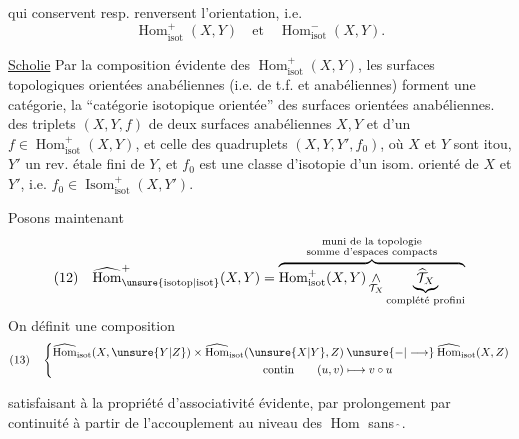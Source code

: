 qui conservent resp. renversent l'orientation, i.e.
\[
\operatorname{Hom}_{\mathrm{isot}}^+(X,Y)\quad\text{et}\quad\operatorname{Hom}_{\mathrm{isot}}^-(X,Y).
\]

\uline{Scholie} Par la composition évidente des $\operatorname{Hom}_{\mathrm{isot}}^+(X,Y)$, les surfaces topologiques orientées anabéliennes (i.e. de t.f. et anabéliennes)  forment une catégorie, la ``catégorie isotopique orientée'' des surfaces orientées anabéliennes.   des triplets $(X,Y,f)$ de deux surfaces  anabéliennes $X,Y$ et d'un $f\in\operatorname{Hom}_{\mathrm{isot}}^+(X,Y)$, et celle des quadruplets $(X,Y,Y',f_0)$, où $X$ et $Y$ sont itou, $Y'$ un rev. étale fini de $Y$, et $f_0$ est une classe d'isotopie d'un isom. orienté de $X$ et $Y'$, i.e. $f_0\in\operatorname{Isom}_{\mathrm{isot}}^+(X,Y')$.

Posons maintenant
\[
(12)\quad
\widehat{\operatorname{Hom}}^{+}_{\unsure{\mathrm{isotop}|\mathrm{isot}}}(X,Y)
=\overbrace{\operatorname{Hom}^{+}_{\mathrm{isot}}(X,Y)\mathop{\wedge}_{\mathcal{T}_X}
\underbrace{\widehat{\mathcal{T}}_X}_{\text{complété profini}}}^{\substack{\text{muni de la topologie}\\\text{somme d'espaces compacts}}}
\]
On définit une composition
\[
(13)\quad\left\{
\begin{aligned}
\widehat{\operatorname{Hom}}_{\mathrm{isot}}(X,\unsure{Y|Z})\times
\widehat{\operatorname{Hom}}_{\mathrm{isot}}(\unsure{X|Y},Z)
&\mathbin{\unsure{-|\longrightarrow}}\widehat{\operatorname{Hom}}_{\mathrm{isot}}(X,Z)\\
\text{contin}\qquad (u,v)&\longmapsto v\circ u
\end{aligned}\right.
\]

satisfaisant à la propriété d'associativité évidente, par prolongement par continuité à partir de l'accouplement au niveau des $\operatorname{Hom}$ sans $\hat{\ }$. 

